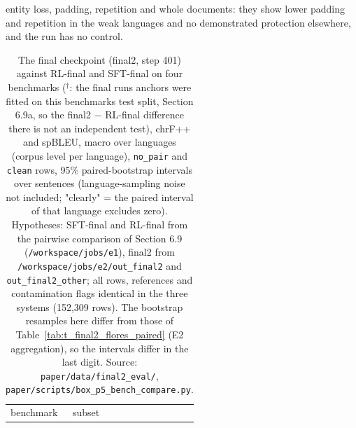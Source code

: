 entity loss, padding, repetition and whole documents: they show lower padding and repetition in the weak languages and no demonstrated protection elsewhere, and the run has no control.

\begin{table}[t]
\centering
\scriptsize
\setlength{\tabcolsep}{3pt}
\caption{The final checkpoint (final2, step 401) against RL-final and SFT-final on four benchmarks (\(^\dagger\): the final run\textquotesingle s anchors were fitted on this benchmark\textquotesingle s test split, Section 6.9a, so the final2 \(-\) RL-final difference there is not an independent test), chrF++ and spBLEU, macro over languages (corpus level per language), \texttt{no\_pair} and \texttt{clean} rows, 95\% paired-bootstrap intervals over sentences (language-sampling noise not included; "clearly" = the paired interval of that language excludes zero). Hypotheses: SFT-final and RL-final from the pairwise comparison of Section 6.9 (\texttt{/workspace/jobs/e1}), final2 from \texttt{/workspace/jobs/e2/out\_final2} and \texttt{out\_final2\_other}; all rows, references and contamination flags identical in the three systems (152,309 rows). The bootstrap resamples here differ from those of Table~\ref{tab:t_final2_flores_paired} (E2 aggregation), so the intervals differ in the last digit. Source: \texttt{paper/data/final2\_eval/}, \texttt{paper/scripts/box\_p5\_bench\_compare.py}.}
\label{tab:t_final2_bench}
{\def\LTcaptype{none} %
\begin{tabular}{@{}
  >{\raggedright\arraybackslash}p{}
  >{\raggedright\arraybackslash}p{}
  >{\raggedleft\arraybackslash}p{}
  >{\raggedleft\arraybackslash}p{}
  >{\raggedleft\arraybackslash}p{}
  >{\raggedleft\arraybackslash}p{}
  >{\raggedleft\arraybackslash}p{}
  >{\raggedleft\arraybackslash}p{}
  >{\raggedleft\arraybackslash}p{}
  >{\raggedleft\arraybackslash}p{}@{}}
\toprule
\begin{minipage}[b]{\linewidth}\raggedright
benchmark
\end{minipage} & \begin{minipage}[b]{\linewidth}\raggedright
subset

\end{minipage}
\end{tabular}}
\end{table}
